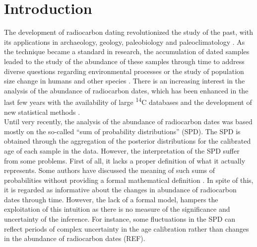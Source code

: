 \documentclass[a4paper]{article}
\begin{document}
\beginingpreprint

\linenumbers


\section*{\centering Introduction}

The development of radiocarbon dating \parencite{Libby1949} revolutionized the study of the past, with its applications in archaeology, geology, paleobiology and paleoclimatology \parencite{Taylor1995,BronkRamsey2008}. As the technique became a standard in research, the accumulation of dated samples leaded to the study of the abundance of these samples through time to address diverse questions regarding environmental processes \parencite[\emph{e.g.} changes in sea level, forest fire frequency or fluvial activity;][]{Geyh1980, Pierce2004, Thorndycraft2006} or the study of population size change in humans and other species \parencite[\emph{e.g.}][]{Rick1987,Broughton2018}.
There is an increasing interest in the analysis of the abundance of radiocarbon dates, which has been enhanced in the last few years with the availability of large \textsuperscript{14}C databases \parencite[e.g.][]{Chaput2016} and the development of new statistical methods \parencite[reviewed in][]{Crema2022}.
\\

Until very recently, the analysis of the abundance of radiocarbon dates was based mostly on the so-called ``sum of probability distributions'' (SPD). The SPD is obtained through the aggregation of the posterior distributions for the calibrated age of each sample in the data. However, the interpretation of the SPD suffer from some problems. First of all, it lacks a proper definition of what it actually represents. Some authors have discussed the meaning of such sums of probabilities without providing a formal mathematical definition \parencite[\emph{e.g.}][]{Carleton2021,Crema2022}. In spite of this, it is regarded as informative about the changes in abundance of radiocarbon dates through time. However, the lack of a formal model, hampers the exploitation of this intuition as there is no measure of the significance and uncertainty of the inference. For instance, some fluctuations in the SPD can reflect periods of complex uncertainty in the age calibration rather than changes in the abundance of radiocarbon dates (REF).
\\
\end{document}
